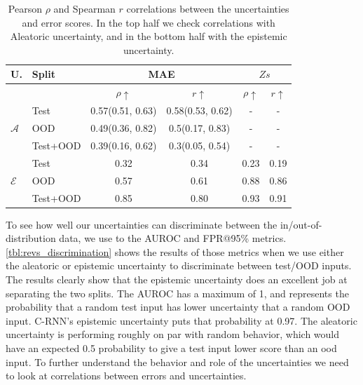\begin{table}[htbp]
\centering
    \begin{tabular}{l l c c c c}  
        \toprule
        U. & Split & \multicolumn{2}{c}{MAE} & \multicolumn{2}{c}{$Zs$}\\
        \midrule
        & & $\rho \uparrow$ & $r \uparrow$ & $\rho \uparrow$ & $r \uparrow$ \\
        \multirow{3}{*}{$\mathcal{A}$} 
            & Test     & 0.57(0.51, 0.63) & 0.58(0.53, 0.62) & - & - \\  
            & OOD      & 0.49(0.36, 0.82) & 0.5(0.17, 0.83) & - & - \\  
            & Test+OOD & 0.39(0.16, 0.62) & 0.3(0.05, 0.54) & - & - \\ 

        \midrule
        \multirow{3}{*}{$\mathcal{E}$} 
            & Test     & 0.32  & 0.34 &  0.23  & 0.19 \\  
            & OOD      & 0.57 & 0.61 &  0.88 & 0.86 \\
            & Test+OOD & 0.85 & 0.80 &  0.93 & 0.91 \\ 

        \toprule
    \end{tabular}
    \caption[Revs uncertainty-error correlations for C-RNN]{Pearson $\rho$ and Spearman $r$ correlations between the uncertainties and error scores. In the top half we check correlations with Aleatoric uncertainty, and in the bottom half with the epistemic uncertainty.}
    \label{tbl:revs_corr}
\end{table}


To see how well our uncertainties can discriminate between the in/out-of-distribution data, we use to the AUROC and FPR@95\% metrics. \cref{tbl:revs_discrimination} shows the results of those metrics when we use either the aleatoric or epistemic uncertainty to discriminate between test/OOD inputs. The results clearly show that the epistemic uncertainty does an excellent job at separating the two splits. The AUROC has a maximum of 1, and represents the probability that a random test input has lower uncertainty that a random OOD input. C-RNN's epistemic uncertainty puts that probability at 0.97. The aleatoric uncertainty is performing roughly on par with random behavior, which would have an expected 0.5 probability to give a test input lower score than an ood input.
To further understand the behavior and role of the uncertainties we need to look at correlations between errors and uncertainties. 


